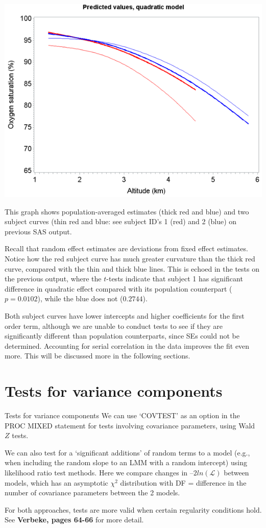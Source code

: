 \documentclass[
  9pt,
  ignorenonframetext,
]{beamer}
\begin{document}
\begin{frame}{}
\protect\hypertarget{section-13}{}
\begin{center}\includegraphics[width=0.6\linewidth]{figs_L7/f5} \end{center}

This graph shows population-averaged estimates (thick red and blue) and
two subject curves (thin red and blue: see subject ID's 1 (red) and 2
(blue) on previous SAS output.

Recall that random effect estimates are deviations from fixed effect
estimates. Notice how the red subject curve has much greater curvature
than the thick red curve, compared with the thin and thick blue lines.
This is echoed in the tests on the previous output, where the
\(t\)-tests indicate that subject 1 has significant difference in
quadratic effect compared with its population counterpart
(\(p=0.0102\)), while the blue does not (\(0.2744\)).

Both subject curves have lower intercepts and higher coefficients for
the first order term, although we are unable to conduct tests to see if
they are significantly different than population counterparts, since SEs
could not be determined. Accounting for serial correlation in the data
improves the fit even more. This will be discussed more in the following
sections.
\end{frame}

\hypertarget{tests-for-variance-components}{%
\section{Tests for variance
components}\label{tests-for-variance-components}}

\begin{frame}{Tests for variance components}
\protect\hypertarget{tests-for-variance-components-1}{}
We can use `COVTEST' as an option in the PROC MIXED statement for tests
involving covariance parameters, using Wald \(Z\) tests.

We can also test for a `significant additions' of random terms to a
model (e.g., when including the random slope to an LMM with a random
intercept) using likelihood ratio test methods. Here we compare changes
in \(–2ln(\mathcal L)\) between models, which has an asymptotic
\(\chi^2\) distribution with DF = difference in the number of covariance
parameters between the 2 models.

For both approaches, tests are more valid when certain regularity
conditions hold. See \textbf{Verbeke, pages 64-66} for more detail.
\end{frame}
\end{document}
